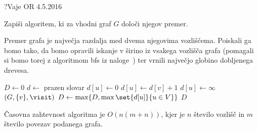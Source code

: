 \begin{naloga}{?}{Vaje OR 4.5.2016}
\begin{vprasanje}
Zapiši algoritem, ki za vhodni graf $G$ določi njegov premer.
\end{vprasanje}

\begin{odgovor}
Premer grafa je največja razdalja med dvema njegovima vozliščema.
Poiskali ga bomo tako,
da bomo opravili iskanje v širino iz vsakega vozlišča grafa
(pomagali si bomo torej z algoritmom {\sc bfs} iz naloge~\res[bfs])
ter vrnili največjo globino dobljenega drevesa.
\begin{small}
\begin{algorithmic}
    \State $D \gets 0$
    \State $d \gets$ prazen slovar
            \State $d[u] \gets 0$
        \Else
            \State $d[u] \gets d[v] + 1$
        \EndIf
    \EndFunction
            \State $d[u] \gets \infty$
        \EndFor
        $(G, \{v\}, \visit)$
        \State $D \gets \max\{D, \max\set{d[u]}{u \in V}\}$
    \EndFor
    \State \Return $D$
\EndFunction
\end{algorithmic}
\end{small}
Časovna zahtevnost algoritma je $O(n(m+n))$,
kjer je $n$ število vozlišč in $m$ število povezav podanega grafa.
\end{odgovor}
\end{naloga}
